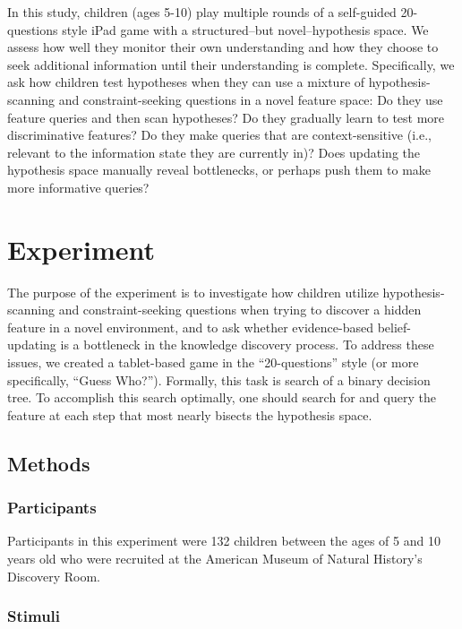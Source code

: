\documentclass[10pt,letterpaper]{article}
\begin{document}
In this study, children (ages 5-10) play multiple rounds of a self-guided 20-questions style iPad game with a structured--but novel--hypothesis space. We assess how well they monitor their own understanding and how they choose to seek additional information until their understanding is complete. Specifically, we ask how children test hypotheses when they can use a mixture of hypothesis-scanning and constraint-seeking questions in a novel feature space: Do they use feature queries and then scan hypotheses? Do they gradually learn to test more discriminative features? Do they make queries that are context-sensitive (i.e., relevant to the information state they are currently in)? Does updating the hypothesis space manually reveal bottlenecks, or perhaps push them to make more informative queries?


\section{Experiment}

The purpose of the experiment is to investigate how children utilize hypothesis-scanning and constraint-seeking questions when trying to discover a hidden feature in a novel environment, and to ask whether evidence-based belief-updating is a bottleneck in the knowledge discovery process. To address these issues, we created a tablet-based game in the ``20-questions'' style (or more specifically, ``Guess Who?''). Formally, this task is search of a binary decision tree. To accomplish this search optimally, one should search for and query the feature at each step that most nearly bisects the hypothesis space.

\subsection{Methods}

\subsubsection{Participants}

Participants in this experiment were 132 children between the ages of 5 and 10 years old who were recruited at the American Museum of Natural History's Discovery Room.

\subsubsection{Stimuli}
\end{document}
